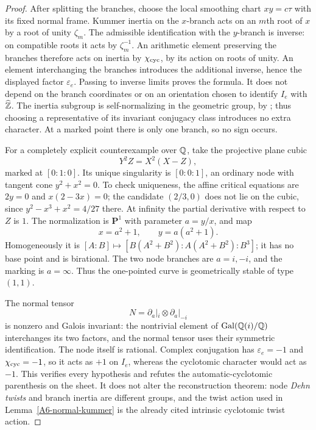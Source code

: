 \begin{proof}
After splitting the branches, choose the local smoothing chart
$xy=c\tau$ with its fixed normal frame. Kummer inertia on the
$x$-branch acts on an $m$th root of $x$ by a root of unity $\zeta_m$.
The admissible identification with the $y$-branch is inverse:
on compatible roots it acts by $\zeta_m^{-1}$. An arithmetic element
preserving the branches therefore acts on inertia by
$\chi_{\rm cyc}$, by its action on roots of unity. An element
interchanging the branches introduces the additional inverse,
hence the displayed factor $\varepsilon_e$. Passing to inverse limits
proves the formula. It does not depend on the branch coordinates or
on an orientation chosen to identify $I_e$ with $\widehat{{\mathbb{Z}}}$.
The inertia subgroup is self-normalizing in the geometric group, by
\cite[Proposition~1.2(ii), p.~461]{Mochizuki2007A567}; thus choosing a
representative of its invariant conjugacy class introduces no extra
character. At a marked point there is only one branch, so no sign
occurs.

For a completely explicit counterexample over ${\mathbb{Q}}$, take the projective
plane cubic
\[
 Y^2Z=X^2(X-Z),
\]
marked at $[0:1:0]$. Its unique singularity is $[0:0:1]$, an ordinary
node with tangent cone $y^2+x^2=0$. To check uniqueness, the affine
critical equations are $2y=0$ and $x(2-3x)=0$; the candidate
$(2/3,0)$ does not lie on the cubic, since
$y^2-x^3+x^2=4/27$ there. At infinity the partial derivative with
respect to $Z$ is $1$. The normalization is $\mathbf P^1$ with
parameter $a=y/x$, and map
\[
 x=a^2+1,\qquad y=a(a^2+1).
\]
Homogeneously it is
$[A:B]\mapsto[B(A^2+B^2):A(A^2+B^2):B^3]$; it has no base point
and is birational. The two node branches are $a=i,-i$, and the
marking is $a=\infty$. Thus the one-pointed curve is geometrically
stable of type $(1,1)$.

The normal tensor
\[
 N=\partial_a|_{i}\otimes\partial_a|_{-i}
\]
is nonzero and Galois invariant: the nontrivial element of
$\operatorname{Gal}({\mathbb{Q}}(i)/{\mathbb{Q}})$ interchanges its two factors, and the
normal tensor uses their symmetric identification. The node itself is
rational. Complex conjugation has $\varepsilon_e=-1$ and
$\chi_{\rm cyc}=-1$, so it acts as $+1$ on $I_e$, whereas the
cyclotomic character would act as $-1$. This verifies every
hypothesis and refutes the automatic-cyclotomic parenthesis on the
sheet. It does not alter the reconstruction theorem: node \emph{Dehn
twists} and branch inertia are different groups, and the twist action
used in Lemma~\ref{A6-normal-kummer} is the already cited intrinsic
cyclotomic twist action.
\end{proof}
